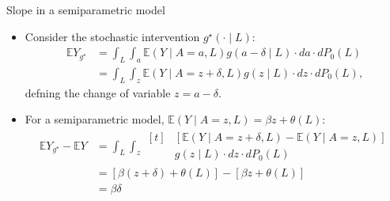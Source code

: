 \documentclass{beamer}
\newcommand{\E}{\mathbb{E}}
\begin{document}
\begin{frame}[c]{Slope in a semiparametric model}

\begin{center}
\begin{itemize}
  \itemsep10pt
  \item Consider the stochastic intervention $g^{\star}(\cdot \mid L)$:
    \begin{align*}
      \E Y_{g^{\star}} &= \int_L \int_a \E(Y \mid A = a, L) g(a - \delta
            \mid L) \cdot da \cdot dP_0(L) \\
        &= \int_L \int_z \E(Y \mid A = z + \delta, L) g(z \mid L) \cdot dz
          \cdot dP_0(L),
    \end{align*}
      defning the change of variable $z = a - \delta$.
  \item For a semiparametric model, $\E (Y \mid A = z, L) = \beta z +
    \theta(L)$:
    \begin{align*}
      \E Y_{g^{\star}} - \E Y &= \int_L \int_z
      \begin{aligned}[t]
        & [\E(Y \mid A = z + \delta, L) - \E(Y \mid A = z, L)] \\
        & g(z \mid L) \cdot dz \cdot dP_0(L)
      \end{aligned} \\
      &= [\beta (z + \delta) + \theta(L)] - [\beta z + \theta(L)] \\
      &= \beta \delta
    \end{align*}
\end{itemize}
\end{center}

\note{
}

\end{frame}


\setbeamercovered{}
\beamerdefaultoverlayspecification{}

\begin{frame}[c,allowframebreaks]{}

\small

\nocite{*}


\end{frame}

\end{document}
